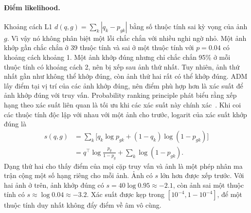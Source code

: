 \documentclass[10pt,twocolumn,letterpaper]{article}
\begin{document}
\paragraph{Điểm likelihood.} Khoảng cách L1 $d(q,g)=\sum_k|q_k-p_{gk}|$ bằng số thuộc tính sai kỳ vọng của ảnh $g$. Vì vậy nó không phân biệt một lỗi chắc chắn với nhiều nghi ngờ nhỏ. Một ảnh khớp gần chắc chắn ở 39 thuộc tính và sai ở một thuộc tính với $p=0.04$ có khoảng cách khoảng 1. Một ảnh khớp đúng nhưng chỉ chắc chắn 95\% ở mỗi thuộc tính có khoảng cách 2, nên bị xếp sau ảnh thứ nhất. Tuy nhiên, ảnh thứ nhất gần như không thể khớp đúng, còn ảnh thứ hai rất có thể khớp đúng. ADM lấy điểm tại vị trí của các ảnh khớp đúng, nên điểm phù hợp hơn là xác suất để ảnh khớp đúng với truy vấn. Probability ranking principle phát biểu rằng xếp hạng theo xác suất liên quan là tối ưu khi các xác suất này chính xác~\cite{prp}. Khi coi các thuộc tính độc lập với nhau với một ảnh cho trước, logarit của xác suất khớp đúng là
\begin{equation}
\begin{aligned}
s(q,g)&=\sum_{k}\big[q_k\log p_{gk}+(1-q_k)\log(1-p_{gk})\big]\\
&=q^\top\log\frac{p_g}{1-p_g}+\sum_k\log(1-p_{gk}).
\end{aligned}
\label{eq:ll}
\end{equation}
Dạng thứ hai cho thấy điểm của mọi cặp truy vấn và ảnh là một phép nhân ma trận cộng một số hạng riêng cho mỗi ảnh. Ảnh có $s$ lớn hơn được xếp trước. Với hai ảnh ở trên, ảnh khớp đúng có $s=40\log0.95\approx-2.1$, còn ảnh sai một thuộc tính có $s\approx\log0.04\approx-3.2$. Xác suất được kẹp trong $[10^{-4},1-10^{-4}]$, để một thuộc tính duy nhất không đẩy điểm về âm vô cùng.
\end{document}
